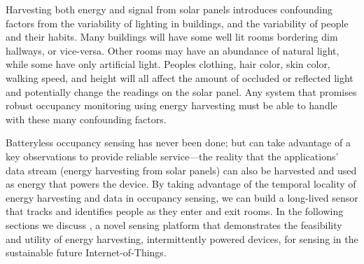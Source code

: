 Harvesting both energy and signal from solar panels introduces confounding factors from the variability of lighting in buildings, and the variability of people and their habits.
Many buildings will have some well lit rooms bordering dim hallways, or vice-versa. 
Other rooms may have an abundance of natural light, while some have only artificial light.
Peoples clothing, hair color, skin color, walking speed, and height will all affect the amount of occluded or reflected light and potentially change the readings on the solar panel.
Any system that promises robust occupancy monitoring using energy harvesting must be able to handle with these many confounding factors.







Batteryless occupancy sensing has never been done; but can take advantage of a key observations to provide reliable service---the reality that the applications' data stream (energy harvesting from solar panels) can also be harvested and used as energy that powers the device.
By taking advantage of the temporal locality of energy harvesting and data in occupancy sensing, we can build a long-lived sensor that tracks and identifies people as they enter and exit rooms.
In the following sections we discuss \sysname, a novel sensing platform that demonstrates the feasibility and utility of energy harvesting, intermittently powered devices, for sensing in the sustainable future Internet-of-Things.

